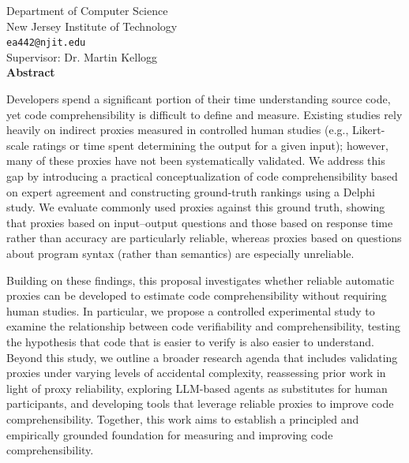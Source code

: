 Department of Computer Science\\
New Jersey Institute of Technology\\
\texttt{ea442@njit.edu}\\
Supervisor: Dr. Martin Kellogg\\[0.8em] %

\textbf{Abstract}

Developers spend a significant portion of their time understanding source code,
yet code comprehensibility is difficult to define and measure.
Existing studies rely heavily on indirect proxies measured in controlled human studies
(e.g., Likert-scale ratings or time spent determining the output for a given input);
however, many of these proxies have not been systematically validated.
We address this gap by introducing a practical conceptualization of code comprehensibility
based on expert agreement and constructing ground-truth rankings using a Delphi study.
We evaluate commonly used proxies against this ground truth,
showing that proxies based on input–output questions
and those based on response time rather than accuracy are particularly reliable,
whereas proxies based on questions about program syntax (rather than semantics)
are especially unreliable.

Building on these findings,
this proposal investigates whether reliable automatic proxies can be developed
to estimate code comprehensibility without requiring human studies.
In particular, we propose a controlled experimental study
to examine the relationship between code verifiability and comprehensibility,
testing the hypothesis that code that is easier to verify
is also easier to understand.
Beyond this study, we outline a broader research agenda
that includes validating proxies under varying levels of accidental complexity,
reassessing prior work in light of proxy reliability,
exploring LLM-based agents as substitutes for human participants,
and developing tools that leverage reliable proxies to improve code comprehensibility.
Together, this work aims to establish a principled and empirically grounded foundation
for measuring and improving code comprehensibility.
